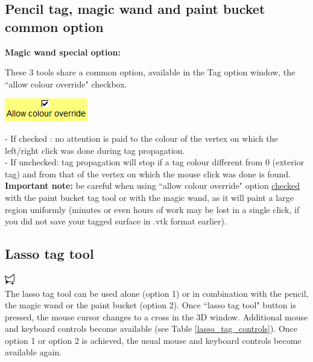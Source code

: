 \subsection{Pencil tag, magic wand and paint bucket common option}
\noindent
\textbf{Magic wand special option:}\\
\noindent
\begin{minipage}{0.6\textwidth}
These 3 tools share a common option, available in the Tag option
window, the ``allow colour override" checkbox.\end{minipage}    
\begin{minipage}{0.4\textwidth}\centering
  \includegraphics[scale=0.5]{images/Tags/Allow_colour_override.png}
 \end{minipage} 
\noindent
- If checked : no attention is paid to the colour of the vertex on
which the left/right click was done during tag propagation.\\
- If unchecked: tag propagation will stop if a tag colour different from 0 (exterior tag) and from that of the vertex on which the mouse click was done is found.\\
\textbf{Important note:} be careful when using ``allow colour override" option \underline{checked} with the paint bucket tag tool or with the magic wand, as it will paint a large region uniformly (minutes or even hours of work may be lost in a single click, if you did not save your tagged surface in .vtk format earlier).

\subsection{Lasso tag tool} \label{lasso_tag_section}
\includegraphics[scale=0.7]{images/pixmap/Lasso_plus.png}\\
The lasso tag tool can be used alone (option 1) or in combination with the pencil, the magic wand or the paint bucket (option 2). Once ``lasso tag tool" button is pressed, the mouse cursor changes to a cross in the 3D window. Additional mouse and keyboard controls become available (see Table \ref{lasso_tag_controls}). Once option 1 or option 2 is achieved, the usual mouse and keyboard controls become available
again.

